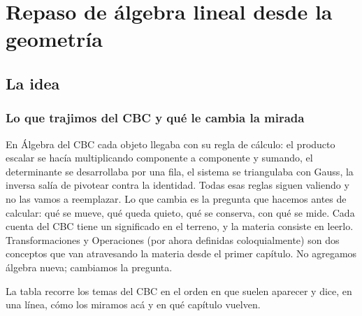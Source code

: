 \chapter{Repaso de álgebra lineal desde la geometría}\label{cap:03}

\section{La idea}

\subsection{Lo que trajimos del CBC y qué le cambia la mirada}\label{sec:cbc-mirada}

En Álgebra del CBC cada objeto llegaba con su regla de cálculo: el producto escalar se
hacía multiplicando componente a componente y sumando, el determinante se desarrollaba por
una fila, el sistema se triangulaba con Gauss, la inversa salía de pivotear contra la
identidad. Todas esas reglas siguen valiendo y no las vamos a reemplazar. Lo que cambia es
la pregunta que hacemos antes de calcular: qué se mueve, qué queda quieto, qué se conserva,
con qué se mide. Cada cuenta del CBC tiene un significado en el terreno, y la materia
consiste en leerlo. Transformaciones y
Operaciones (por ahora definidas coloquialmente) son dos conceptos que van atravesando la
materia desde el primer capítulo. No agregamos álgebra nueva; cambiamos la pregunta.

La tabla recorre los temas del CBC en el orden en que suelen aparecer y dice, en una línea,
cómo los miramos acá y en qué capítulo vuelven.

